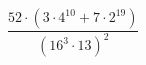 \begin{ex}[type=calculate]
	\begin{condition}
		\( \dfrac{52\cdot(3\cdot4^{10}+7\cdot2^{19})}{(16^3\cdot13)^2} \)
	\end{condition}
\end{ex}
